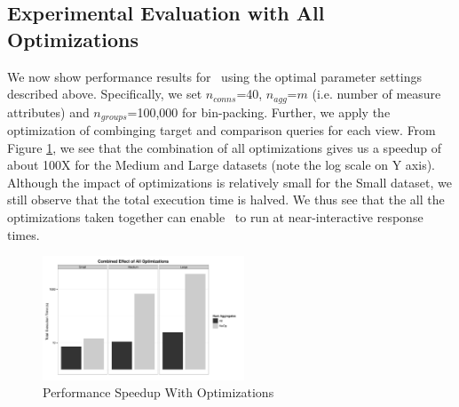 \subsection{Experimental Evaluation with All Optimizations}

We now show performance results for \SeeDB\ using the optimal parameter settings
described above. Specifically, we set $n_{conns}$=40, $n_{agg}$=$m$ (i.e.
number of measure attributes) and $n_{groups}$=100,000 for bin-packing. Further,
we apply the optimization of combinging target and comparison queries for each view. From
Figure \ref{fig:total_speed_up}, we see that the combination of all
optimizations gives us a speedup of about 100X for the Medium and Large
datasets (note the log scale on Y axis). Although the impact of optimizations is
relatively small for the Small dataset, we still observe that the total
execution time is halved. We thus see that the all the optimizations
taken together can enable \SeeDB\ to run at near-interactive response times.

\begin{figure}[h]
  \centering
    \includegraphics[width=6cm]{Images/total_speedup.pdf}
  \caption{Performance Speedup With Optimizations} 
  \label{fig:total_speed_up}
\end{figure}






